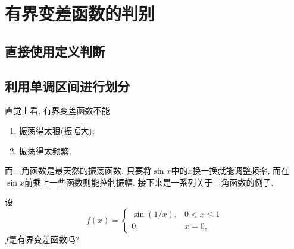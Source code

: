 \section{有界变差函数的判别}

\subsection{直接使用定义判断}

\subsection{利用单调区间进行划分}
直觉上看, 有界变差函数不能
\begin{enumerate}
    \item 振荡得太狠(振幅大);
    \item 振荡得太频繁.
\end{enumerate}
而三角函数是最天然的振荡函数, 只要将$\sin x$中的$x$换一换就能调整频率, 而在$\sin x$前乘上一些函数则能控制振幅. 接下来是一系列关于三角函数的例子.
\begin{example}
    设
    $$f(x)=\begin{cases}
        \sin (1/x), & 0 < x \leq 1 \\
        0,          & x = 0,
    \end{cases}$$
    $f$是有界变差函数吗? 
\end{example}
